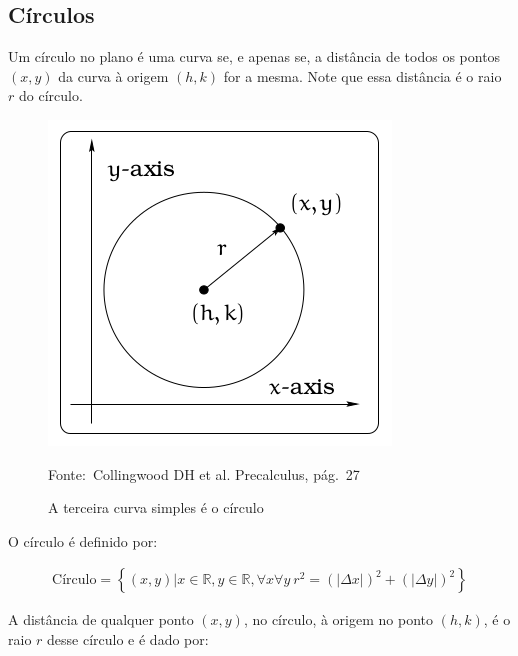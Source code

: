 \documentclass[pdftex, brazil, 12pt, twoside]{article}
\begin{document}
\subsection{Círculos}
\label{tres-curvas-circulos}

Um círculo no plano é uma curva se, e apenas se, a distância de todos os pontos
$(x, y)$ da curva à origem $(h, k)$ for a mesma. Note que essa distância é o raio $r$
do círculo.

\begin{figure}[ht]
  \begin{center}
    \caption{A terceira curva simples é o círculo}
    \label{fig:curvas-circulo}
    \includegraphics[scale=0.7]{imagens/definicao-circulo.png}
    
    \footnotesize{Fonte:~Collingwood DH et al. Precalculus, pág.\ 27}
  \end{center}
\end{figure}

O círculo é definido por:

\begin{equation}
  \begin{split}
    \text{Círculo} = \left\{(x, y) | x \in \mathbb{R}, y \in \mathbb{R}, \forall x \forall y\ r^2 = (|\Delta x|)^2 + (|\Delta y|)^2\right\}
  \end{split}
\end{equation}

A distância de qualquer ponto $(x, y)$, no círculo, à origem no ponto $(h, k)$, é o raio $r$ desse círculo
e é dado por:
\end{document}

